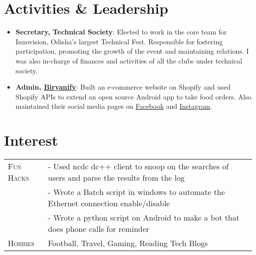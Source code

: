 \documentclass[a4paper,10pt]{extarticle} %
\begin{document}
\vspace{-0.6cm}
\section{\textcolor{primary}{Activities \& Leadership}}

\begin{itemize}[leftmargin=0.55cm, rightmargin=0.2cm, label={\Large\textbullet}]
\item \textbf{Secretary, {Technical Society}}: 
Elected to work in the core team for Innovision, Odisha's largest Technical Fest. Responsible for fostering participation, promoting the growth of the event and maintaining relations. I was also in-charge of finances and activities of all the clubs under technical society.

\item \textbf{Admin, \href{https://www.biryanify.com}{Biryanify}}: Built an e-commerce website on Shopify and used Shopify APIs to extend an open source Android app to take food orders. Also maintained their social media pages on \href{https://www.facebook.com/biryanify}{Facebook} and \href{https://www.instagram.com/biryanify/}{Instagram}.
\end{itemize}

\vspace{-0.15cm}
\section{\textcolor{primary}{Interest}}
\begin{tabularx}{\linewidth}{ l | X }
\textsc{Fun Hacks} & {- Used ncdc dc++ client to snoop on the searches of users and parse the results from the log  }\\
& {- Wrote a Batch script in windows to automate the Ethernet connection enable/disable }\\
& {- Wrote a python script on Android to make a bot that does phone calls for reminder }\\

\textsc{Hobbies} & {Football, Travel, Gaming, Reading Tech Blogs}\\


\end{tabularx}
\end{document}
